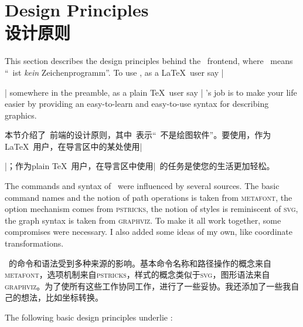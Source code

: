 %
%
%

 
\section{Design Principles\\设计原则}

This section describes the design principles behind the \tikzname\ frontend,
where \tikzname\ means ``\tikzname\ ist \emph{kein} Zeichenprogramm''. To use
\tikzname, as a \LaTeX\ user say |\usepackage{tikz}| somewhere in the preamble,
as a plain \TeX\ user say | \tikzname's job is to make your
life easier by providing an easy-to-learn and easy-to-use syntax for describing
graphics.

本节介绍了\tikzname\ 前端的设计原则，其中\tikzname\ 表示``\tikzname\ 不是绘图软件''。要使用\tikzname，作为\LaTeX\ 用户，在导言区中的某处使用|\usepackage{tikz}|；作为plain \TeX\ 用户，在导言区中使用|\tikzname\ 的任务是使您的生活更加轻松。

The commands and syntax of \tikzname\ were influenced by several sources. The
basic command names and the notion of path operations is taken from
\textsc{metafont}, the option mechanism comes from \textsc{pstricks}, the
notion of styles is reminiscent of \textsc{svg}, the graph syntax is taken from
\textsc{graphviz}. To make it all work together, some compromises were
necessary. I also added some ideas of my own, like coordinate transformations.

\tikzname\ 的命令和语法受到多种来源的影响。基本命令名称和路径操作的概念来自\textsc{metafont}，选项机制来自\textsc{pstricks}，样式的概念类似于\textsc{svg}，图形语法来自\textsc{graphviz}。为了使所有这些工作协同工作，进行了一些妥协。我还添加了一些我自己的想法，比如坐标转换。


The following basic design principles underlie \tikzname:

